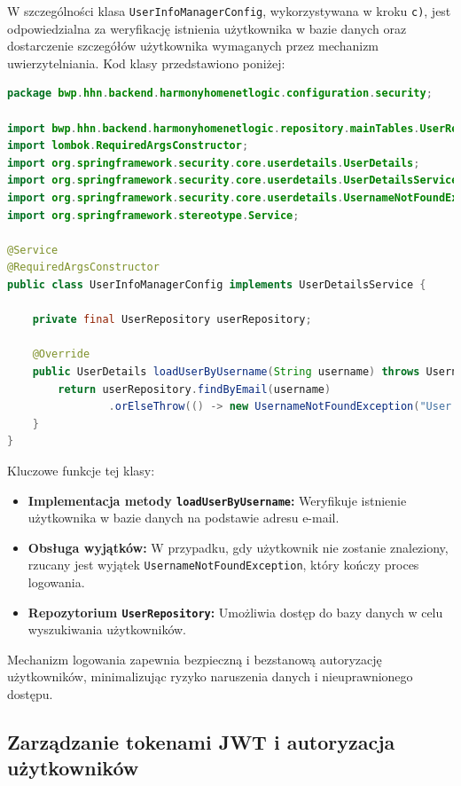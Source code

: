 W szczególności klasa \texttt{UserInfoManagerConfig}, wykorzystywana w kroku \texttt{c)}, jest odpowiedzialna za weryfikację istnienia użytkownika w bazie danych oraz dostarczenie szczegółów użytkownika wymaganych przez mechanizm uwierzytelniania. Kod klasy przedstawiono poniżej:

\begin{lstlisting}[language=Java, caption=Klasa \texttt{UserInfoManagerConfig} odpowiedzialna za zarządzanie użytkownikami]
package bwp.hhn.backend.harmonyhomenetlogic.configuration.security;

import bwp.hhn.backend.harmonyhomenetlogic.repository.mainTables.UserRepository;
import lombok.RequiredArgsConstructor;
import org.springframework.security.core.userdetails.UserDetails;
import org.springframework.security.core.userdetails.UserDetailsService;
import org.springframework.security.core.userdetails.UsernameNotFoundException;
import org.springframework.stereotype.Service;

@Service
@RequiredArgsConstructor
public class UserInfoManagerConfig implements UserDetailsService {

    private final UserRepository userRepository;

    @Override
    public UserDetails loadUserByUsername(String username) throws UsernameNotFoundException {
        return userRepository.findByEmail(username)
                .orElseThrow(() -> new UsernameNotFoundException("User not found"));
    }
}
\end{lstlisting}

Kluczowe funkcje tej klasy:
\begin{itemize}
    \item \textbf{Implementacja metody \texttt{loadUserByUsername}:} Weryfikuje istnienie użytkownika w bazie danych na podstawie adresu e-mail.
    \item \textbf{Obsługa wyjątków:} W przypadku, gdy użytkownik nie zostanie znaleziony, rzucany jest wyjątek \texttt{UsernameNotFoundException}, który kończy proces logowania.
    \item \textbf{Repozytorium \texttt{UserRepository}:} Umożliwia dostęp do bazy danych w celu wyszukiwania użytkowników.
\end{itemize}

Mechanizm logowania zapewnia bezpieczną i bezstanową autoryzację użytkowników, minimalizując ryzyko naruszenia danych i nieuprawnionego dostępu.

\subsection{Zarządzanie tokenami JWT i autoryzacja użytkowników}

